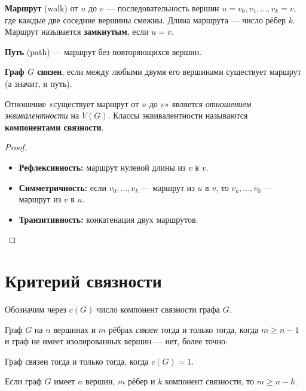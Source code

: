 \documentclass[12pt]{article}
\begin{document}
\begin{definition}
\textbf{Маршрут} (walk) от $u$ до $v$ --- последовательность
вершин $u = v_0, v_1, \ldots, v_k = v$, где каждые две соседние
вершины смежны. Длина маршрута --- число рёбер $k$.
Маршрут называется \textbf{замкнутым}, если $u = v$.

\textbf{Путь} (path) --- маршрут без повторяющихся вершин.

\textbf{Граф $G$ связен}, если между любыми двумя его вершинами
существует маршрут (а значит, и путь).
\end{definition}

\begin{theorem}
Отношение «существует маршрут от $u$ до $v$» является
\emph{отношением эквивалентности} на $V(G)$.
Классы эквивалентности называются \textbf{компонентами связности}.
\end{theorem}

\begin{proof}
\begin{itemize}
\item \textbf{Рефлексивность:} маршрут нулевой длины из $v$ в $v$.
\item \textbf{Симметричность:} если $v_0,\ldots,v_k$ --- маршрут из $u$ в $v$,
      то $v_k,\ldots,v_0$ --- маршрут из $v$ в $u$.
\item \textbf{Транзитивность:} конкатенация двух маршрутов.
\end{itemize}
\end{proof}

\section{Критерий связности}

\begin{definition}
Обозначим через $c(G)$ число компонент связности графа $G$.
\end{definition}

\begin{theorem}
Граф $G$ на $n$ вершинах и $m$ рёбрах \emph{связен} тогда и только
тогда, когда $m \geq n - 1$ и граф не имеет изолированных вершин ---
нет, более точно:

Граф связен тогда и только тогда, когда $c(G) = 1$.
\end{theorem}

\begin{theorem}
Если граф $G$ имеет $n$ вершин, $m$ рёбер и $k$ компонент связности,
то $m \geq n - k$.
\end{theorem}
\end{document}

